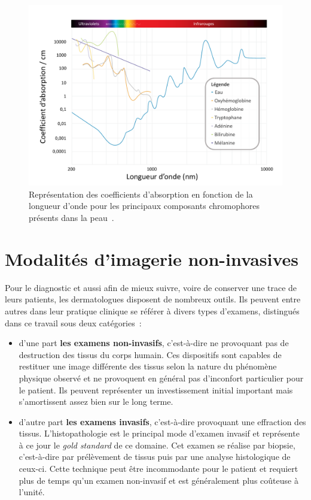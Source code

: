 \begin{figure}[H]
    \centering
    \includegraphics[width=\linewidth]{contents/chapter_2/resources/scheme_light_absorption.pdf}
    \caption{Représentation des coefficients d'absorption en fonction de la longueur d'onde pour les principaux composants chromophores présents dans la peau~\cite{Raulin2013}.}
    \label{fig:scheme_light_absorption}
\end{figure}
 
\clearpage

\section{Modalités d’imagerie non-invasives}
Pour le diagnostic et aussi afin de mieux suivre, voire de conserver une trace de leurs patients, les dermatologues disposent de nombreux outils. Ils peuvent entre autres dans leur pratique clinique se référer à divers types d’examens, distingués dans ce travail sous deux catégories~:
\begin{itemize}
    \item d’une part \textbf{les examens non-invasifs}, c’est-à-dire ne provoquant pas de destruction des tissus du corps humain. Ces dispositifs sont capables de restituer une image différente des tissus selon la nature du phénomène physique observé et ne provoquent en général pas d’inconfort particulier pour le patient. Ils peuvent représenter un investissement initial important mais s'amortissent assez bien sur le long terme. 
    \item d’autre part \textbf{les examens invasifs}, c’est-à-dire provoquant une effraction des tissus. L'histopathologie est le principal mode d'examen invasif et représente à ce jour le \textit{gold standard} de ce domaine. Cet examen se réalise par biopsie, c’est-à-dire par prélèvement de tissus puis par une analyse histologique de ceux-ci. Cette technique peut être incommodante pour le patient et requiert plus de temps qu'un examen non-invasif et est généralement plus coûteuse à l'unité.
\end{itemize}\par

